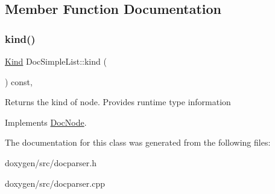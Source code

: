 \subsection{Member Function Documentation}
\mbox{\label{class_doc_simple_list_a91f28875fab4da3e5cbb348b7a064e08}} 
\subsubsection{\texorpdfstring{kind()}{kind()}}
{\footnotesize\ttfamily \mbox{\hyperlink{class_doc_node_aebd16e89ca590d84cbd40543ea5faadb}{Kind}} Doc\+Simple\+List\+::kind (\begin{DoxyParamCaption}{ }\end{DoxyParamCaption}) const\hspace{0.3cm}{\ttfamily [inline]}, {\ttfamily [virtual]}}

Returns the kind of node. Provides runtime type information 

Implements \mbox{\hyperlink{class_doc_node_a108ffd214a72ba6e93dac084a8f58049}{Doc\+Node}}.



The documentation for this class was generated from the following files\+:\begin{DoxyCompactItemize}
\item 
doxygen/src/docparser.\+h\item 
doxygen/src/docparser.\+cpp\end{DoxyCompactItemize}

